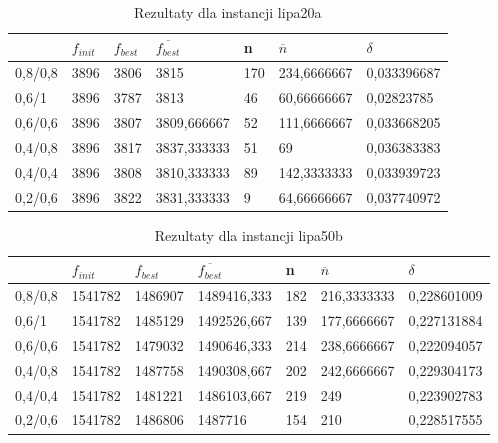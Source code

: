 \begin{table}[H]
\label{T3_lipa20a}
\begin{tabular}{l l l l l l l}
\hline
 & $f_{init}$ & $f_{best}$ & $\overline{f_{best}}$ & n & $\overline{n}$ & $\delta$ \\
\hline
0,8/0,8 & 3896 & 3806 & 3815 & 170 & 234,6666667 & 0,033396687\\
0,6/1 & 3896 & 3787 & 3813 & 46 & 60,66666667 & 0,02823785\\
0,6/0,6 & 3896 & 3807 & 3809,666667 & 52 & 111,6666667 & 0,033668205\\
0,4/0,8 & 3896 & 3817 & 3837,333333 & 51 & 69 & 0,036383383\\
0,4/0,4 & 3896 & 3808 & 3810,333333 & 89 & 142,3333333 & 0,033939723\\
0,2/0,6 & 3896 & 3822 & 3831,333333 & 9 & 64,66666667 & 0,037740972\\
\hline
\end{tabular}
\caption{Rezultaty dla instancji lipa20a}
\end{table}

\begin{table}[H]
\label{T3_lipa50b}
\begin{tabular}{l l l l l l l}
\hline
 & $f_{init}$ & $f_{best}$ & $\overline{f_{best}}$ & n & $\overline{n}$ & $\delta$ \\
\hline
0,8/0,8 & 1541782 & 1486907 & 1489416,333 & 182 & 216,3333333 & 0,228601009\\
0,6/1 & 1541782 & 1485129 & 1492526,667 & 139 & 177,6666667 & 0,227131884\\
0,6/0,6 & 1541782 & 1479032 & 1490646,333 & 214 & 238,6666667 & 0,222094057\\
0,4/0,8 & 1541782 & 1487758 & 1490308,667 & 202 & 242,6666667 & 0,229304173\\
0,4/0,4 & 1541782 & 1481221 & 1486103,667 & 219 & 249 & 0,223902783\\
0,2/0,6 & 1541782 & 1486806 & 1487716 & 154 & 210 & 0,228517555\\
\hline
\end{tabular}
\caption{Rezultaty dla instancji lipa50b}
\end{table}

